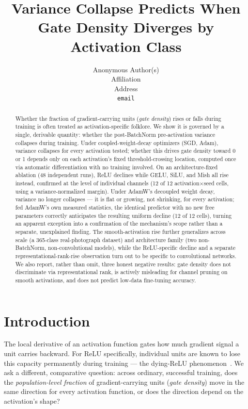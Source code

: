 \documentclass{article}
\title{Variance Collapse Predicts When Gate Density Diverges by Activation Class}
\author{%
  Anonymous Author(s) \\
  Affiliation \\
  Address \\
  \texttt{email}
}
\begin{document}
\maketitle

\begin{abstract}
Whether the fraction of gradient-carrying units (\emph{gate density}) rises or falls during training is often treated as activation-specific folklore. We show it is governed by a single, derivable quantity: whether the post-BatchNorm pre-activation variance collapses during training. Under coupled-weight-decay optimizers (SGD, Adam), variance collapses for every activation tested; whether this drives gate density toward 0 or 1 depends only on each activation's fixed threshold-crossing location, computed once via automatic differentiation with no training involved. On an architecture-fixed ablation (48 independent runs), ReLU declines while GELU, SiLU, and Mish all rise instead, confirmed at the level of individual channels (12 of 12 activation$\times$seed cells, using a variance-normalized margin). Under AdamW's decoupled weight decay, variance no longer collapses --- it is flat or growing, not shrinking, for every activation; fed AdamW's own measured statistics, the identical predictor with no new free parameters correctly anticipates the resulting uniform decline (12 of 12 cells), turning an apparent exception into a confirmation of the mechanism's scope rather than a separate, unexplained finding. The smooth-activation rise further generalizes across scale (a 365-class real-photograph dataset) and architecture family (two non-BatchNorm, non-convolutional models), while the ReLU-specific decline and a separate representational-rank-rise observation turn out to be specific to convolutional networks. We also report, rather than omit, three honest negative results: gate density does not discriminate via representational rank, is actively misleading for channel pruning on smooth activations, and does not predict low-data fine-tuning accuracy.
\end{abstract}

\section{Introduction}

The local derivative of an activation function gates how much gradient signal a unit carries backward. For ReLU specifically, individual units are known to lose this capacity permanently during training --- the dying-ReLU phenomenon~\citep{lu2019dying}. We ask a different, comparative question: across ordinary, successful training, does the \emph{population-level fraction} of gradient-carrying units (\emph{gate density}) move in the same direction for every activation function, or does the direction depend on the activation's shape?
\end{document}
